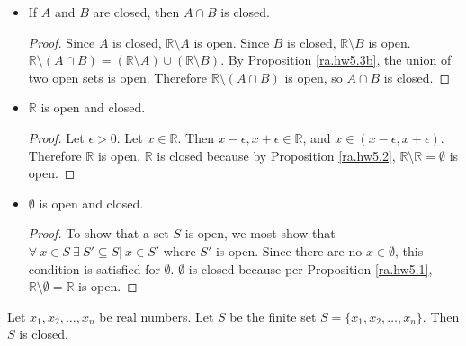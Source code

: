 \begin{itemize}
\begin{proof}
\end{proof}

\item \begin{proposition}\label{ra.hw5.4a} If \(A\) and \(B\) are closed, then \(A \cap B\) is closed. \end{proposition} 

\begin{proof} Since \(A\) is closed, \(\mathbb{R} \setminus A\) is open. Since \(B\) is closed, \(\mathbb{R} \setminus B\) is open. \(\mathbb{R} \setminus (A \cap B) = (\mathbb{R} \setminus A) \cup (\mathbb{R} \setminus B)\). By Proposition \ref{ra.hw5.3b}, the union of two open sets is open. Therefore \(\mathbb{R} \setminus (A \cap B) \) is open, so \(A \cap B\) is closed.

\end{proof}

\item \begin{proposition}\label{ra.hw5.1} \(\mathbb{R}\) is open and closed. \end{proposition}

\begin{proof} Let \(\epsilon > 0\). Let \(x \in \mathbb{R}\). Then \(x - \epsilon, x + \epsilon \in \mathbb{R}\), and \(x \in (x - \epsilon, x + \epsilon)\). Therefore \(\mathbb{R}\) is open. \(\mathbb{R}\) is closed because by Proposition \ref{ra.hw5.2}, \(\mathbb{R} \setminus \mathbb{R} = \emptyset\) is open. \end{proof}

\item \begin{proposition}\label{ra.hw5.2} \(\emptyset\) is open and closed. \end{proposition}

\begin{proof} To show that a set \(S\) is open, we most show that \(\forall \ x \in  S \ \exists \ S' \subseteq S | \ x \in S' \) where \(S'\) is open. Since there are no \(x \in \emptyset\), this condition is satisfied for \(\emptyset\). \(\emptyset\) is closed because per Proposition \ref{ra.hw5.1}, \(\mathbb{R} \setminus \emptyset = \mathbb{R}\) is open.

\end{proof}

\end{itemize}

\begin{proposition}\label{ra.hw5.6a} Let \(x_1, x_2, \ldots, x_n\) be real numbers. Let \(S\) be the finite set \(S = \{x_1, x_2, \ldots, x_n\}\). Then \(S\) is closed.\end{proposition}

